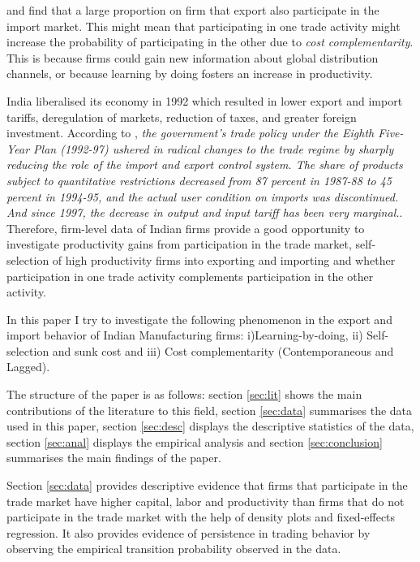 \documentclass[12pt]{article}
\begin{document}
\textcite{muuls2009imports} and \textcite{aristei2013firms} find that
a large proportion on firm that export also participate in the import
market. This might mean that participating in one trade activity might increase the probability of
participating in the other due to \textit{cost complementarity}. This is
because  firms could gain new information about global distribution
channels, or because learning by doing fosters an increase in productivity.   %


India liberalised its economy in
1992 which resulted in lower export and import
tariffs, deregulation of markets, reduction of taxes, and greater 
foreign investment. According to \textcite{topalova2011trade}, \textit{the government's trade policy under the Eighth Five-Year Plan (1992-97) ushered
in radical changes to the trade regime by sharply reducing the role of
the import and export control system. The share of products subject to quantitative restrictions
decreased from 87 percent in 1987-88 to 45 percent in 1994-95, and the actual user
condition on imports was discontinued. And since 1997, the decrease in
output and input tariff has been very marginal.}. Therefore,
firm-level data of Indian firms provide a good opportunity to
investigate  productivity gains from participation in
the trade  market, self-selection of high productivity firms into
exporting and importing and 
whether participation in one trade activity complements participation
in the other activity.

In this paper I try to investigate the following phenomenon in the
export and import behavior of Indian Manufacturing firms:
i)Learning-by-doing, ii) Self-selection and sunk cost and iii) Cost
complementarity (Contemporaneous and Lagged). 

The structure of the paper is as follows: section \ref{sec:lit} shows
the main contributions of the literature to this field, section
\ref{sec:data} summarises the data used in this paper, section
\ref{sec:desc} displays the descriptive statistics of the data,
section \ref{sec:anal} displays the empirical analysis and section 
\ref{sec:conclusion} summarises the main findings of the paper. 

Section \ref{sec:data} provides descriptive evidence that firms that
participate in the trade market have higher capital, labor and
productivity than firms that do not participate in the trade
market with the help of density plots and fixed-effects regression.  It also provides evidence of  persistence in trading
behavior by observing the empirical transition probability observed in
the data. 
\end{document}
